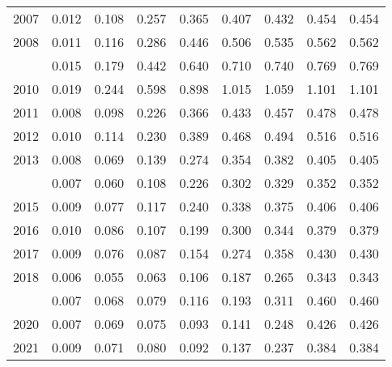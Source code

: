 \documentclass[
]{article}
\begin{document}
\begin{longtable}[t]{lrrrrrrrr}
2007 & 0.012 & 0.108 & 0.257 & 0.365 & 0.407 & 0.432 & 0.454 & 0.454\\
2008 & 0.011 & 0.116 & 0.286 & 0.446 & 0.506 & 0.535 & 0.562 & 0.562\\
\addlinespace
2009 & 0.015 & 0.179 & 0.442 & 0.640 & 0.710 & 0.740 & 0.769 & 0.769\\
2010 & 0.019 & 0.244 & 0.598 & 0.898 & 1.015 & 1.059 & 1.101 & 1.101\\
2011 & 0.008 & 0.098 & 0.226 & 0.366 & 0.433 & 0.457 & 0.478 & 0.478\\
2012 & 0.010 & 0.114 & 0.230 & 0.389 & 0.468 & 0.494 & 0.516 & 0.516\\
2013 & 0.008 & 0.069 & 0.139 & 0.274 & 0.354 & 0.382 & 0.405 & 0.405\\
\addlinespace
2014 & 0.007 & 0.060 & 0.108 & 0.226 & 0.302 & 0.329 & 0.352 & 0.352\\
2015 & 0.009 & 0.077 & 0.117 & 0.240 & 0.338 & 0.375 & 0.406 & 0.406\\
2016 & 0.010 & 0.086 & 0.107 & 0.199 & 0.300 & 0.344 & 0.379 & 0.379\\
2017 & 0.009 & 0.076 & 0.087 & 0.154 & 0.274 & 0.358 & 0.430 & 0.430\\
2018 & 0.006 & 0.055 & 0.063 & 0.106 & 0.187 & 0.265 & 0.343 & 0.343\\
\addlinespace
2019 & 0.007 & 0.068 & 0.079 & 0.116 & 0.193 & 0.311 & 0.460 & 0.460\\
2020 & 0.007 & 0.069 & 0.075 & 0.093 & 0.141 & 0.248 & 0.426 & 0.426\\
2021 & 0.009 & 0.071 & 0.080 & 0.092 & 0.137 & 0.237 & 0.384 & 0.384\\*
\end{longtable}
\end{document}
